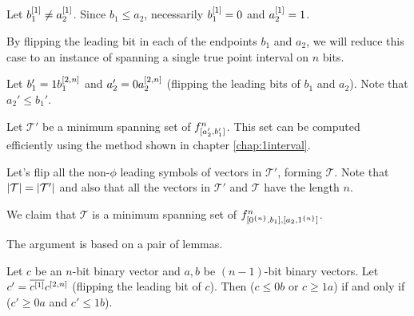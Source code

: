 
Let $b_1^{[1]} \neq a_2^{[1]}$.
Since $b_1 \leq a_2$,
necessarily $b_1^{[1]} = 0$ and $a_2^{[1]} = 1$.

By flipping the leading bit in each of the endpoints
$b_1$ and $a_2$,
we will reduce this case
to an instance of spanning a single true point interval
on $n$ bits.


Let $b_1' = 1 b_1^{[2, n]}$
and $a_2' = 0 a_2^{[2, n]}$
(flipping the leading bits of $b_1$ and $a_2$).
Note that $a_2' \leq b_1'$.

Let $\mathcal{T}'$ be a minimum spanning set
of $f^{n}_{[a_2', b_1']}$.
This set can be computed efficiently
using the method shown
in chapter \ref{chap:1interval}.

Let's flip all the non-$\phi$ leading symbols
of vectors in $\mathcal{T}'$,
forming $\mathcal{T}$.
Note that $\lvert\mathcal{T}\rvert = \lvert\mathcal{T}'\rvert$
and also that all the vectors in $\mathcal{T}'$
and $\mathcal{T}$ have the length $n$.

We claim that $\mathcal{T}$ is a minimum spanning set
of $f^{n}_{[0^{\{n\}}, b_1], [a_2, 1^{\{n\}}]}$.

The argument is based on a pair of lemmas.

\begin{lemma}
\label{lemma:cflip}
Let $c$ be an $n$-bit binary vector
and $a, b$ be $(n-1)$-bit binary vectors.
Let $c' = \overline{c^{[1]}} c^{[2, n]}$
(flipping the leading bit of $c$).
Then ($c \leq 0 b$ or $c \geq 1 a$)
if and only if
($c' \geq 0 a$ and $c' \leq 1 b$).
\end{lemma}

